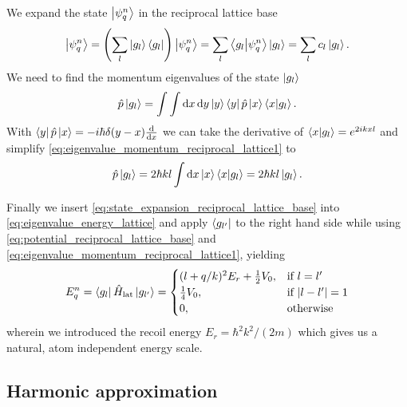 We expand the state $\ket{\psi^n_{q}}$ in the reciprocal lattice base
\begin{equation}
  \ket{\psi^n_{q}}
  =\left(\sum_l\ket{g_l}\bra{g_l}\right)\ket{\psi^n_{q}}
  =\sum_l\braket{g_l}{\psi^n_{q}}\ket{g_l}
  =\sum_lc_l\ket{g_l}
  \label{eq:state_expansion_reciprocal_lattice_base}.
\end{equation}
We need to find the momentum eigenvalues of the state $\ket{g_l}$
\begin{equation}
  \hat{p}\ket{g_l}
  =\int\int\dd{x}\dd{y}\ket{y}\bra{y}\hat{p}\ket{x}\bra{x}\ket{g_l}
  \label{eq:eigenvalue_momentum_reciprocal_lattice1}.
\end{equation}
With $\bra{y}\hat{p}\ket{x}=-i\hbar\delta(y-x)\dv{x}$ we can take the
derivative of $\bra{x}\ket{g_l}=e^{2ikxl}$ and simplify
\cref{eq:eigenvalue_momentum_reciprocal_lattice1} to
\begin{equation}
  \hat{p}\ket{g_l}
  =2\hbar kl\int\dd{x}\ket{x}\bra{x}\ket{g_l}
  =2\hbar kl\ket{g_l}
  \label{eq:eigenvalue_momentum_reciprocal_lattice1}.
\end{equation}

Finally we insert \cref{eq:state_expansion_reciprocal_lattice_base} into
\cref{eq:eigenvalue_energy_lattice} and apply $\bra{g_{l^\prime}}$ to the
right hand side while using \cref{eq:potential_reciprocal_lattice_base} and
\cref{eq:eigenvalue_momentum_reciprocal_lattice1}, yielding
\begin{equation}
  E^n_q
  =\bra{g_{l}}\hat{H}_\text{lat}\ket{g_{l^\prime}}
  =
  \begin{cases}
    (l+q/k)^2E_r+\frac{1}{2}V_0, & \text{if } l=l^\prime\\
    \frac{1}{4}V_0, & \text{if } \abs{l-l^\prime}=1\\
    0, & \text{otherwise}
  \end{cases}
  \label{eq:eigenvalue_energy_energy_lattice_final}
\end{equation}
wherein we introduced the recoil energy $E_r=\hbar^2k^2/(2m)$ which gives us
a natural, atom independent energy scale.

\subsection{Harmonic approximation}

